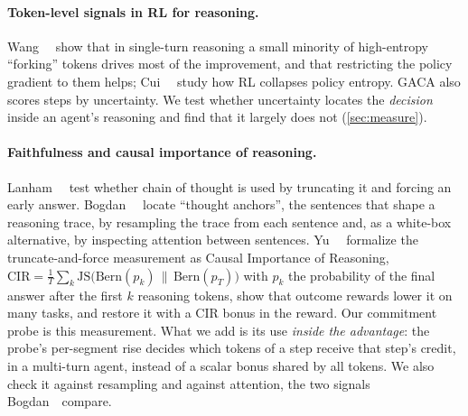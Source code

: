 \paragraph{Token-level signals in RL for reasoning.}
Wang~\etal~\cite{wang2025beyond} show that in single-turn reasoning a small minority of high-entropy
``forking'' tokens drives most of the improvement, and that restricting the policy gradient to them
helps; Cui~\etal~\cite{cui2025entropy} study how RL collapses policy entropy. GACA also scores steps by
uncertainty. We test whether uncertainty locates the \emph{decision} inside an agent's reasoning and
find that it largely does not (\cref{sec:measure}).

\paragraph{Faithfulness and causal importance of reasoning.}
Lanham~\etal~\cite{lanham2023faithfulness} test whether chain of thought is used by truncating it and
forcing an early answer. Bogdan~\etal~\cite{bogdan2025anchors} locate ``thought anchors'', the
sentences that shape a reasoning trace, by resampling the trace from each sentence and, as a white-box
alternative, by inspecting attention between sentences. Yu~\etal~\cite{yu2026cir} formalize the
truncate-and-force measurement as Causal Importance of Reasoning,
$\mathrm{CIR} = \frac{1}{T}\sum_k \mathrm{JS}\big(\mathrm{Bern}(p_k)\,\|\,\mathrm{Bern}(p_T)\big)$
with $p_k$ the probability of the final answer after the first $k$ reasoning tokens, show that outcome
rewards lower it on many tasks, and restore it with a CIR bonus in the reward. Our commitment probe is
this measurement. What we add is its use \emph{inside the advantage}: the probe's per-segment rise
decides which tokens of a step receive that step's credit, in a multi-turn agent, instead of a scalar
bonus shared by all tokens. We also check it against resampling and against attention, the two
signals Bogdan~\etal~compare.

